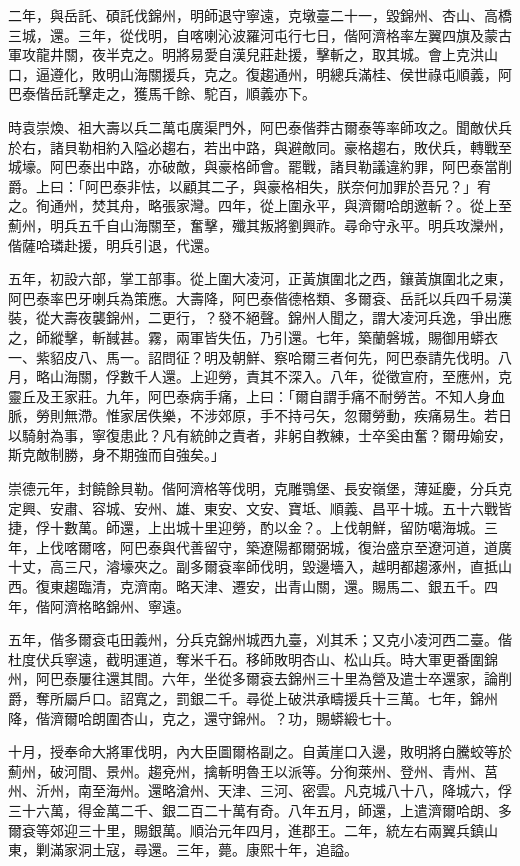 \begin{pinyinscope}
二年，與岳託、碩託伐錦州，明師退守寧遠，克墩臺二十一，毀錦州、杏山、高橋三城，還。三年，從伐明，自喀喇沁波羅河屯行七日，偕阿濟格率左翼四旗及蒙古軍攻龍井關，夜半克之。明將易愛自漢兒莊赴援，擊斬之，取其城。會上克洪山口，逼遵化，敗明山海關援兵，克之。復趨通州，明總兵滿桂、侯世祿屯順義，阿巴泰偕岳託擊走之，獲馬千餘、駝百，順義亦下。

時袁崇煥、祖大壽以兵二萬屯廣渠門外，阿巴泰偕莽古爾泰等率師攻之。聞敵伏兵於右，諸貝勒相約入隘必趨右，若出中路，與避敵同。豪格趨右，敗伏兵，轉戰至城壕。阿巴泰出中路，亦破敵，與豪格師會。罷戰，諸貝勒議違約罪，阿巴泰當削爵。上曰：「阿巴泰非怯，以顧其二子，與豪格相失，朕奈何加罪於吾兄？」宥之。徇通州，焚其舟，略張家灣。四年，從上圍永平，與濟爾哈朗邀斬？。從上至薊州，明兵五千自山海關至，奮擊，殲其叛將劉興祚。尋命守永平。明兵攻灤州，偕薩哈璘赴援，明兵引退，代還。

五年，初設六部，掌工部事。從上圍大凌河，正黃旗圍北之西，鑲黃旗圍北之東，阿巴泰率巴牙喇兵為策應。大壽降，阿巴泰偕德格類、多爾袞、岳託以兵四千易漢裝，從大壽夜襲錦州，二更行，？發不絕聲。錦州人聞之，謂大凌河兵逸，爭出應之，師縱擊，斬馘甚。霧，兩軍皆失伍，乃引還。七年，築蘭磐城，賜御用蟒衣一、紫貂皮八、馬一。詔問征？明及朝鮮、察哈爾三者何先，阿巴泰請先伐明。八月，略山海關，俘數千人還。上迎勞，責其不深入。八年，從徵宣府，至應州，克靈丘及王家莊。九年，阿巴泰病手痛，上曰：「爾自謂手痛不耐勞苦。不知人身血脈，勞則無滯。惟家居佚樂，不涉郊原，手不持弓矢，忽爾勞動，疾痛易生。若日以騎射為事，寧復患此？凡有統帥之責者，非躬自教練，士卒奚由奮？爾毋媮安，斯克敵制勝，身不期強而自強矣。」

崇德元年，封饒餘貝勒。偕阿濟格等伐明，克雕鶚堡、長安嶺堡，薄延慶，分兵克定興、安肅、容城、安州、雄、東安、文安、寶坻、順義、昌平十城。五十六戰皆捷，俘十數萬。師還，上出城十里迎勞，酌以金？。上伐朝鮮，留防噶海城。三年，上伐喀爾喀，阿巴泰與代善留守，築遼陽都爾弼城，復治盛京至遼河道，道廣十丈，高三尺，濬壕夾之。副多爾袞率師伐明，毀邊墻入，越明都趨涿州，直抵山西。復東趨臨清，克濟南。略天津、遷安，出青山關，還。賜馬二、銀五千。四年，偕阿濟格略錦州、寧遠。

五年，偕多爾袞屯田義州，分兵克錦州城西九臺，刈其禾；又克小凌河西二臺。偕杜度伏兵寧遠，截明運道，奪米千石。移師敗明杏山、松山兵。時大軍更番圍錦州，阿巴泰屢往還其間。六年，坐從多爾袞去錦州三十里為營及遣士卒還家，論削爵，奪所屬戶口。詔寬之，罰銀二千。尋從上破洪承疇援兵十三萬。七年，錦州降，偕濟爾哈朗圍杏山，克之，還守錦州。？功，賜蟒緞七十。

十月，授奉命大將軍伐明，內大臣圖爾格副之。自黃崖口入邊，敗明將白騰蛟等於薊州，破河間、景州。趨兗州，擒斬明魯王以派等。分徇萊州、登州、青州、莒州、沂州，南至海州。還略滄州、天津、三河、密雲。凡克城八十八，降城六，俘三十六萬，得金萬二千、銀二百二十萬有奇。八年五月，師還，上遣濟爾哈朗、多爾袞等郊迎三十里，賜銀萬。順治元年四月，進郡王。二年，統左右兩翼兵鎮山東，剿滿家洞土寇，尋還。三年，薨。康熙十年，追謚。


\end{pinyinscope}

